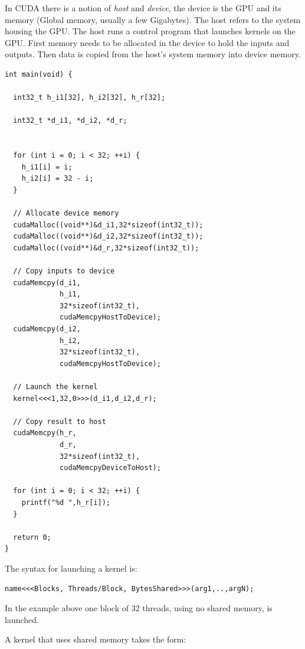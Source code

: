 \documentclass[a4paper]{book}
\begin{document}
In CUDA there is a notion of {\em host} and {\em device}, the device is the GPU and 
its memory (Global memory, usually a few Gigabytes). The host refers to the system housing 
the GPU. The host runs a control program that launches kernels on the GPU. First memory 
needs to be allocated in the device to hold the inputs and outputs. Then data is copied from 
the host's system memory into device memory. 

\begin{small}
\begin{Verbatim}[samepage=true]
int main(void) {
  
  int32_t h_i1[32], h_i2[32], h_r[32]; 

  int32_t *d_i1, *d_i2, *d_r;

  
  for (int i = 0; i < 32; ++i) { 
    h_i1[i] = i;
    h_i2[i] = 32 - i;
  }

  // Allocate device memory
  cudaMalloc((void**)&d_i1,32*sizeof(int32_t));
  cudaMalloc((void**)&d_i2,32*sizeof(int32_t));
  cudaMalloc((void**)&d_r,32*sizeof(int32_t));
  
  // Copy inputs to device
  cudaMemcpy(d_i1,
             h_i1,
             32*sizeof(int32_t),
             cudaMemcpyHostToDevice);
  cudaMemcpy(d_i2,
             h_i2,
             32*sizeof(int32_t),
             cudaMemcpyHostToDevice);
  
  // Launch the kernel
  kernel<<<1,32,0>>>(d_i1,d_i2,d_r); 

  // Copy result to host
  cudaMemcpy(h_r,
             d_r,
             32*sizeof(int32_t),
             cudaMemcpyDeviceToHost);

  for (int i = 0; i < 32; ++i) { 
    printf("%d ",h_r[i]);
  }

  return 0;
}
\end{Verbatim} 
\end{small}

\pagebreak 

The syntax for launching a kernel is:

\begin{small}
\begin{Verbatim}[samepage=true]
name<<<Blocks, Threads/Block, BytesShared>>>(arg1,..,argN);
\end{Verbatim}
\end{small}

\noindent In the example above one block of 32 threads, using no shared memory, is launched. 

A kernel that uses shared memory takes the form: 
\end{document}
